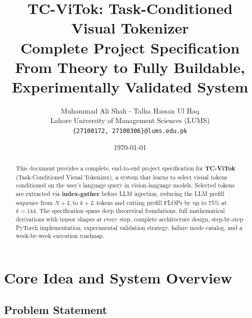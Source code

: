 \documentclass[11pt,a4paper]{article}
\begin{document}

\title{
  \textbf{TC-ViTok: Task-Conditioned Visual Tokenizer} \\[0.4em]
  \Large Complete Project Specification \\[0.3em]
  \large From Theory to Fully Buildable, Experimentally Validated System
}

\author{
  Muhammad Ali Shah - Talha Hassan Ul Haq \\[0.3em]
  Lahore University of Management Sciences (LUMS) \\
  \texttt{\{27100172, 27100306\}@lums.edu.pk}
}

\date{\today}
\maketitle
\thispagestyle{empty}

\begin{abstract}
This document provides a complete, end-to-end project specification for
\textbf{TC-ViTok} (Task-Conditioned Visual Tokenizer), a system that learns
to select visual tokens conditioned on the user's language query in
vision-language models. Selected tokens are extracted via
\textbf{index-gather} before LLM injection, reducing the LLM prefill
sequence from $N{+}L$ to $k{+}L$ tokens and cutting prefill FLOPs by up
to $75\%$ at $k{=}144$. The specification spans deep theoretical
foundations, full mathematical derivations with tensor shapes at every step,
complete architecture design, step-by-step PyTorch implementation,
experimental validation strategy, failure mode catalog, and a week-by-week
execution roadmap.
\end{abstract}

\tableofcontents
\newpage

\section{Core Idea and System Overview}
\label{sec:overview}

\subsection{Problem Statement}
\end{document}
